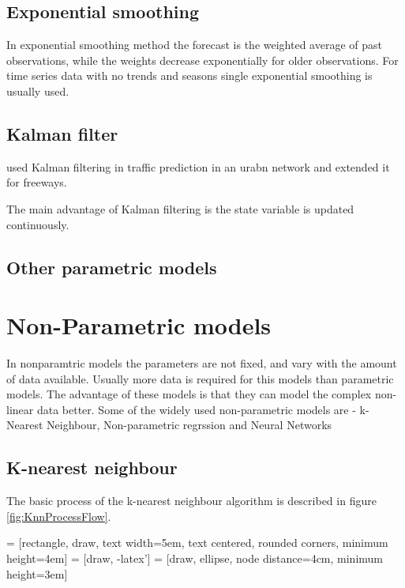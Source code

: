 \subsection{Exponential smoothing}
In exponential smoothing method the forecast is the weighted average of past observations, while
the weights decrease exponentially for older observations. For time series data with no trends
and seasons single exponential smoothing is usually used.


\subsection{Kalman filter}
\citet{okutani1984dynamic} used Kalman filtering in traffic prediction in an urabn network and
extended it for freeways.

The main advantage of Kalman filtering is the state variable is updated continuously.

\subsection{Other parametric models}

\section{Non-Parametric models}
In nonparamtric models the parameters are not fixed, and vary with the amount of data available.
Usually more data is required for this models than parametric models. The advantage of these models
is that they can model the complex non-linear data better. Some of the widely used non-parametric
models are - k-Nearest Neighbour, Non-parametric regrssion and Neural Networks

\subsection{K-nearest neighbour}

The basic process of the k-nearest neighbour algorithm is described in figure
\ref{fig:KnnProcessFlow}.

 = [rectangle, draw, text width=5em, text centered, rounded corners,
minimum height=4em]
 = [draw, -latex']
 = [draw, ellipse, node distance=4cm, minimum height=3em]

